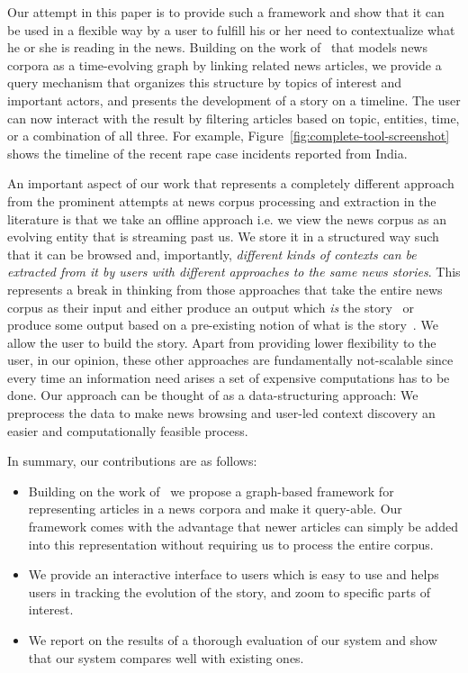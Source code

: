 Our attempt in this paper is to provide such a framework and show that
it can be used in a flexible way by a user to fulfill his or her need
to contextualize what he or she is reading in the news.  Building on
the work of~\cite{choudhary@ecir2008} that models news corpora as a
time-evolving graph by linking related news articles, we provide a
query mechanism that organizes this structure by topics of interest
and important actors, and presents the development of a story on a
timeline. The user can now interact with the result by filtering
articles based on topic, entities, time, or a combination of all
three. For example, Figure~\ref{fig:complete-tool-screenshot} shows
the timeline of the recent rape case incidents reported from India.

An important aspect of our work that represents a completely different
approach from the prominent attempts at news corpus processing and
extraction in the literature is that we take an offline approach
i.e. we view the news corpus as an evolving entity that is streaming
past us. We store it in a structured way such that it can be browsed
and, importantly, {\em different kinds of contexts can be extracted
  from it by users with different approaches to the same news
  stories}. This represents a break in thinking from those approaches
that take the entire news corpus as their input and either produce an
output which {\em is} the story~\cite{shahaf@kdd2010,shahaf@www2012}
or produce some output based on a pre-existing notion of what is the
story~\cite{subasic-icdm:2008,subasic-ida:2013}. We allow the user to
build the story. Apart from providing lower flexibility to the user,
in our opinion, these other approaches are fundamentally not-scalable
since every time an information need arises a set of expensive
computations has to be done. Our approach can be thought of as a
data-structuring approach: We preprocess the data to make news
browsing and user-led context discovery an easier and computationally
feasible process.


In summary, our contributions are as follows:
\begin{itemize}
\item Building on the work of~\cite{choudhary@ecir2008} we propose a
  graph-based framework for representing articles in a news corpora
  and make it query-able. Our framework comes with the advantage that
  newer articles can simply be added into this representation without
  requiring us to process the entire corpus.
\item We provide an interactive interface to users which is easy to
  use and helps users in tracking the evolution of the story, and zoom
  to specific parts of interest.
\item We report on the results of a thorough evaluation of our system
  and show that our system compares well with existing ones.
\end{itemize}

